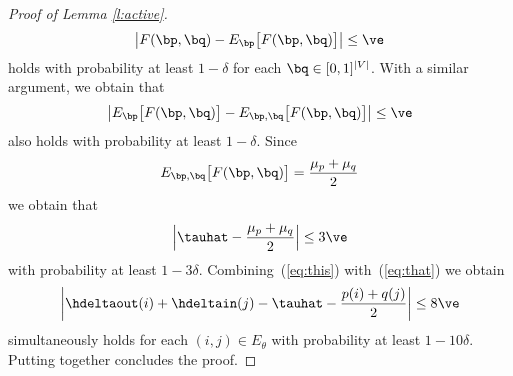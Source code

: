\begin{proof}[Proof of Lemma \ref{l:active}]
\[
	\left| F(\bp,\bq) - E_{\bp}\big[F(\bp,\bq)\big] \right| \le \ve
\]
holds with probability at least $1 -\delta$ for each $\bq\in [0,1]^{|V|}$. With a similar argument, we obtain that
\[
	\left| E_{\bp}\big[F(\bp,\bq)\big] - E_{\bp,\bq}\big[F(\bp,\bq)\big] \right| \le \ve
\]
also holds with probability at least $1 -\delta$. Since
\[
	E_{\bp,\bq}\big[F(\bp,\bq)\big] = \frac{\mu_p+\mu_q}{2}
\]
we obtain that
\begin{equation}
\label{eq:that}
	\Big| \tauhat - \frac{\mu_p+\mu_q}{2} \Big| \le 3\ve
\end{equation}
with probability at least $1-3\delta$. Combining~(\ref{eq:this}) with~(\ref{eq:that}) we obtain
\[
	\left| \hdeltaout(i) + \hdeltain(j) - \tauhat - \frac{p(i) + q(j)}{2} \right| \le 8\ve
\]
simultaneously holds for each $(i,j) \in E_{\theta}$ with probability at least $1 - 10\delta$. Putting together concludes the proof.
\end{proof}
%

\iffalse
****************************************************
\begin{lemma}[Hoeffding's inequality]
\label{l:hoeff}
Let $X_1,\dots,X_n$ be independent random variables such that $X_i \in [0,1]$ and let
\[
	s_n = \frac{1}{n}\sum_{t=1}^n \big(X_t - \E[X_t]\big)~.
\]
Then, for every $\ve > 0$,
$
	\Pr\big(|s_n| \ge \ve\big) \le 2e^{-2n\ve^2}~.
$
\end{lemma}
%
****************************************************
\fi


